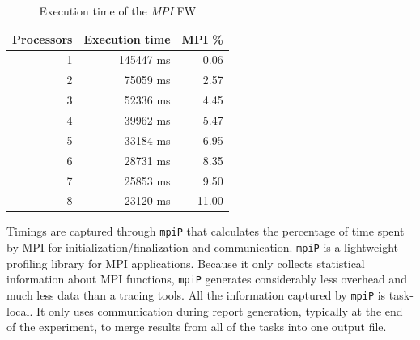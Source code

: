 \begin{table}[h!]
\centering
\begin{tabular}{|r|r|r|}
\hline
\rowcolor[HTML]{F56B00} 
{\color[HTML]{FFFFFF} \textbf{Processors}} & {\color[HTML]{FFFFFF} \textbf{Execution time}} & {\color[HTML]{FFFFFF} \textbf{MPI \%}} \\ \hline
1                                          & 145447 ms                                               & 0.06                                 \\ \hline
2                                          & 75059 ms                                               & 2.57                                 \\ \hline
3                                          & 52336 ms                                               & 4.45                                \\ \hline
4                                          & 39962 ms                                               & 5.47                                \\ \hline
5                                          & 33184 ms                                               & 6.95                                 \\ \hline
6                                          & 28731 ms                                               & 8.35                                \\ \hline
7                                          & 25853 ms                                               & 9.50                                 \\ \hline
8                                          & 23120 ms                                               & 11.00                                \\ \hline
\end{tabular}
\caption{Execution time of the \emph{MPI} FW}                                                                                                                                            
\label{tab:mpi-time}
\end{table}
Timings are captured through \texttt{mpiP} that calculates the percentage of time spent by MPI for initialization/finalization and communication.
\texttt{mpiP} is a lightweight profiling library for MPI applications. Because it only collects statistical information about MPI functions, \texttt{mpiP} generates considerably less overhead and much less data than a tracing tools. All the information captured by \texttt{mpiP} is task-local. It only uses communication during report generation, typically at the end of the experiment, to merge results from all of the tasks into one output file.


